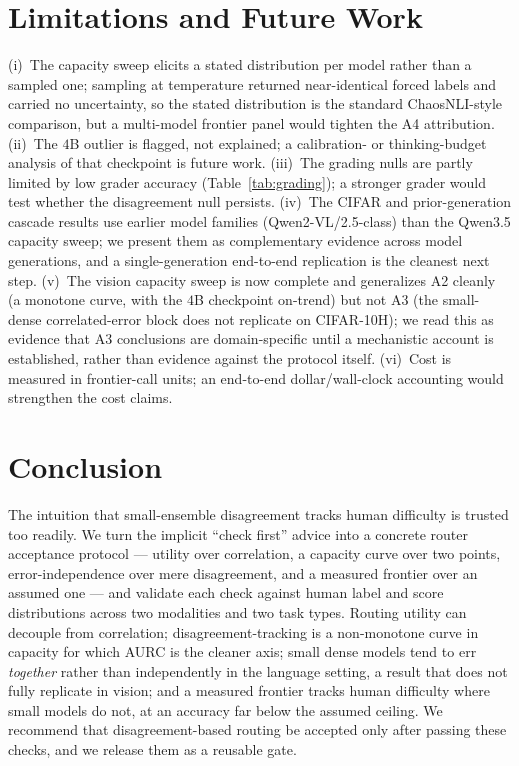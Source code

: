 \documentclass[letterpaper]{article} %
\begin{document}
\section{Limitations and Future Work}
(i)~The capacity sweep elicits a stated distribution per model rather than a
sampled one; sampling at temperature returned near-identical forced labels and
carried no uncertainty, so the stated distribution is the standard
ChaosNLI-style comparison, but a multi-model frontier panel would tighten the A4
attribution. (ii)~The $4$B outlier is flagged, not explained; a calibration- or
thinking-budget analysis of that checkpoint is future work. (iii)~The grading
nulls are partly limited by low grader accuracy (Table~\ref{tab:grading}); a
stronger grader would test whether the disagreement null persists. (iv)~The CIFAR
and prior-generation cascade results use earlier model families
(Qwen2-VL/2.5-class) than the Qwen3.5 capacity sweep; we present them as
complementary evidence across model generations, and a single-generation
end-to-end replication is the cleanest next step. (v)~The vision capacity sweep is
now complete and generalizes A2 cleanly (a monotone curve, with the $4$B checkpoint
on-trend) but not A3 (the small-dense correlated-error block does not replicate on
CIFAR-10H); we read this as evidence that A3 conclusions are domain-specific until
a mechanistic account is established, rather than evidence against the protocol
itself. (vi)~Cost is measured
in frontier-call units; an end-to-end dollar/wall-clock accounting would
strengthen the cost claims.

\section{Conclusion}
The intuition that small-ensemble disagreement tracks human difficulty is trusted
too readily. We turn the implicit ``check first'' advice into a concrete router
acceptance protocol --- utility over correlation, a capacity curve over two points,
error-independence over mere disagreement, and a measured frontier over an assumed
one --- and validate each check against human label and score distributions across
two modalities and two task types. Routing utility can decouple from correlation;
disagreement-tracking is a non-monotone curve in capacity for which AURC is the
cleaner axis; small dense models tend to err \emph{together} rather than independently
in the language setting, a result that does not fully replicate in vision; and a measured frontier tracks human difficulty where
small models do not, at an accuracy far below the assumed ceiling. We recommend
that disagreement-based routing be accepted only after passing these checks, and we
release them as a reusable gate.
\end{document}
